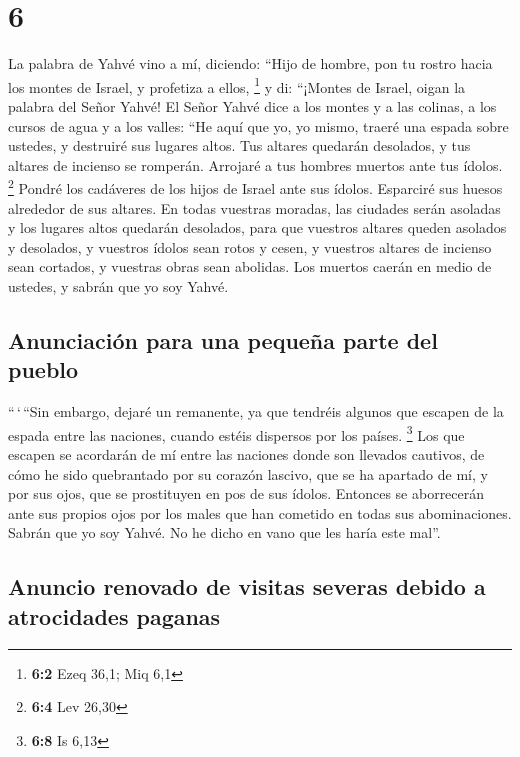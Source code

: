 \hypertarget{section-5}{%
\section{6}\label{section-5}}

 La palabra de Yahvé vino a mí, diciendo: 
``Hijo de hombre, pon tu rostro hacia los montes de Israel, y profetiza
a ellos, \footnote{\textbf{6:2} Ezeq 36,1; Miq 6,1}  y di:
``¡Montes de Israel, oigan la palabra del Señor Yahvé! El Señor Yahvé
dice a los montes y a las colinas, a los cursos de agua y a los valles:
``He aquí que yo, yo mismo, traeré una espada sobre ustedes, y destruiré
sus lugares altos.  Tus altares quedarán desolados, y tus
altares de incienso se romperán. Arrojaré a tus hombres muertos ante tus
ídolos. \footnote{\textbf{6:4} Lev 26,30}  Pondré los
cadáveres de los hijos de Israel ante sus ídolos. Esparciré sus huesos
alrededor de sus altares.  En todas vuestras moradas, las
ciudades serán asoladas y los lugares altos quedarán desolados, para que
vuestros altares queden asolados y desolados, y vuestros ídolos sean
rotos y cesen, y vuestros altares de incienso sean cortados, y vuestras
obras sean abolidas.  Los muertos caerán en medio de
ustedes, y sabrán que yo soy Yahvé.

\hypertarget{anunciaciuxf3n-para-una-pequeuxf1a-parte-del-pueblo}{%
\subsection{Anunciación para una pequeña parte del
pueblo}\label{anunciaciuxf3n-para-una-pequeuxf1a-parte-del-pueblo}}

 ``\,`\,``Sin embargo, dejaré un remanente, ya que
tendréis algunos que escapen de la espada entre las naciones, cuando
estéis dispersos por los países. \footnote{\textbf{6:8} Is 6,13}
 Los que escapen se acordarán de mí entre las naciones
donde son llevados cautivos, de cómo he sido quebrantado por su corazón
lascivo, que se ha apartado de mí, y por sus ojos, que se prostituyen en
pos de sus ídolos. Entonces se aborrecerán ante sus propios ojos por los
males que han cometido en todas sus abominaciones. 
Sabrán que yo soy Yahvé. No he dicho en vano que les haría este mal''.

\hypertarget{anuncio-renovado-de-visitas-severas-debido-a-atrocidades-paganas}{%
\subsection{Anuncio renovado de visitas severas debido a atrocidades
paganas}\label{anuncio-renovado-de-visitas-severas-debido-a-atrocidades-paganas}}

